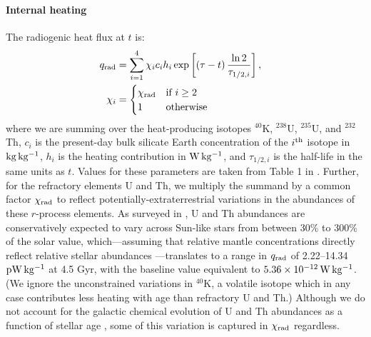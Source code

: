 \documentclass[trackchanges]{aastex63}
\begin{document}
\paragraph{Internal heating} The radiogenic heat flux at $t$ is:
\begin{align}\label{eq:q_rad}
q_{\rm rad} &= \sum_{i = 1}^4 \chi_i c_i h_i \exp\left[\left(\tau - t\right) \frac{\ln 2}{\tau_{1/2, i}}\right], &\\
\chi_i &= \nonumber
\begin{cases}
\chi_{\rm rad} & \textrm{if } i \ge 2 \\
1 & \textrm{otherwise}
\end{cases}
\end{align}
where we are summing over the heat-producing isotopes $^{40}$K, $^{238}$U, $^{235}$U, and $^{232}$Th, $c_i$ is the present-day bulk silicate Earth concentration of the $i^{\rm th}$ isotope in $\rm{kg\,kg^{-1}}$, $h_i$ is the heating contribution in $\rm{W\,kg^{-1}}$, and $\tau_{1/2, i}$ is the half-life in the same units as $t$. Values for these parameters are taken from Table 1 in \citet{oneill_distribution_2020}. Further, for the refractory elements U and Th, we multiply the summand by a common factor $\chi_{\rm rad}$ to reflect potentially-extraterrestrial variations in the abundances of these $r$-process elements. As surveyed in \citet{nimmo_radiogenic_2020}, U and Th abundances are conservatively expected to vary across Sun-like stars from between 30\% to 300\% of the solar value, which---assuming that relative mantle concentrations directly reflect relative stellar abundances \citep{thiabaud_elemental_2015, hinkel_starplanet_2018, putirka_composition_2019, adibekyan_chemical_2021}---translates to a range in $q_{\rm rad}$ of 2.22--14.34 $\rm{pW\,kg^{-1}}$ at 4.5 Gyr, with the baseline value equivalent to $5.36 \times 10^{-12}\,\rm{W\,kg^{-1}}$. (We ignore the unconstrained variations in $^{40}$K, a volatile isotope which in any case contributes less heating with age than refractory U and Th.) Although we do not account for the galactic chemical evolution of U and Th abundances as a function of stellar age \citep{frank_radiogenic_2014}, some of this variation is captured in $\chi_{\rm rad}$ regardless. %
\end{document}
